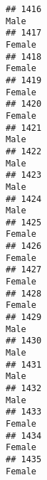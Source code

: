 \documentclass[]{article}
\begin{document}
\begin{verbatim}
## 1416                                                                                                                            Male
## 1417                                                                                                                          Female
## 1418                                                                                                                          Female
## 1419                                                                                                                          Female
## 1420                                                                                                                          Female
## 1421                                                                                                                            Male
## 1422                                                                                                                            Male
## 1423                                                                                                                            Male
## 1424                                                                                                                            Male
## 1425                                                                                                                          Female
## 1426                                                                                                                          Female
## 1427                                                                                                                          Female
## 1428                                                                                                                          Female
## 1429                                                                                                                            Male
## 1430                                                                                                                            Male
## 1431                                                                                                                            Male
## 1432                                                                                                                            Male
## 1433                                                                                                                          Female
## 1434                                                                                                                          Female
## 1435                                                                                                                          Female

\end{verbatim}
\end{document}
